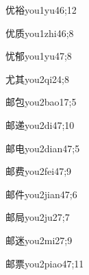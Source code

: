 \begin{verbete}{优裕}{you1yu4}{6;12}
\end{verbete}

\begin{verbete}{优质}{you1zhi4}{6;8}
\end{verbete}

\begin{verbete}{忧郁}{you1yu4}{7;8}
\end{verbete}

\begin{verbete}{尤其}{you2qi2}{4;8}
\end{verbete}

\begin{verbete}{邮包}{you2bao1}{7;5}
\end{verbete}

\begin{verbete}{邮递}{you2di4}{7;10}
\end{verbete}

\begin{verbete}{邮电}{you2dian4}{7;5}
\end{verbete}

\begin{verbete}{邮费}{you2fei4}{7;9}
\end{verbete}

\begin{verbete}{邮件}{you2jian4}{7;6}
\end{verbete}

\begin{verbete}{邮局}{you2ju2}{7;7}
\end{verbete}

\begin{verbete}{邮迷}{you2mi2}{7;9}
\end{verbete}

\begin{verbete}{邮票}{you2piao4}{7;11}
\end{verbete}


